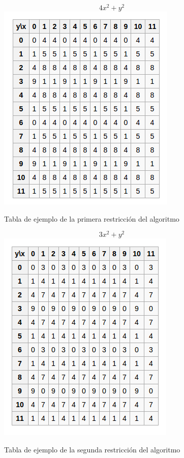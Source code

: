 \documentclass[11pt, conference]{IEEEtran}
\begin{document}
\begin{figure}[h]
	\begin{center}
		\[4x^{2}+y^{2}\]
		\includegraphics[scale=0.5]{2.png}
		\caption{Tabla de ejemplo de la primera restricción del algoritmo} 
	\end{center}
\end{figure}
\pagebreak
\begin{figure}[h]
	\begin{center}
		\[3x^{2}+y^{2}\]
		\includegraphics[scale=0.5]{3.png}
		\caption{Tabla de ejemplo de la segunda restricción del algoritmo} 
	\end{center}
\end{figure}
\end{document}
